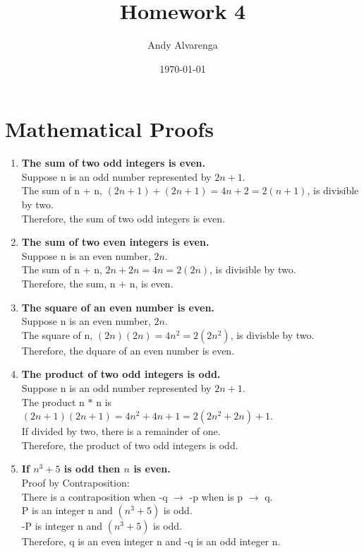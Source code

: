 \documentclass[11pt]{article}
\begin{document}
\title{Homework 4}
\author{Andy Alvarenga}
\date{\today}
\maketitle

\section{Mathematical Proofs}

\begin{enumerate}

\item
\textbf{The sum of two odd integers is even.}\\
Suppose n is an odd number represented by $2n + 1$.\\
The sum of n + n,  $(2n+1)+(2n+1)=4n+2=2(n+1)$, is divisible by two.\\
Therefore, the sum of two odd integers is even.\\

\item
\textbf{The sum of two even integers is even.}\\
Suppose n is an even number, $2n$.\\
The sum of n + n,  $2n+2n=4n=2(2n)$, is divisible by two.\\
Therefore, the sum, n + n, is even.\\

\item
\textbf{The square of an even number is even.}\\
Suppose n is an even number, $2n$.\\
The square of n, $(2n)(2n)=4n^2=2(2n^2)$, is divisble by two.\\
Therefore, the dquare of an even number is even.\\

\item
\textbf{The product of two odd integers is odd.}\\
Suppose n is an odd number represented by $2n + 1$.\\
The product n $*$ n is  $(2n+1)(2n+1)=4n^2+4n+1=2(2n^2+2n)+1$.\\
If divided by two, there is a remainder of one. \\
Therefore, the product of two odd integers is odd.\\

\item
\textbf{If  $n^3+5$ is odd then $n$ is even.}\\
Proof by Contraposition:\\
There is a contraposition when -q $\rightarrow$ -p when is p $\rightarrow$ q.\\
P is an integer n and $(n^3+5)$ is odd.\\
-P is integer n and  $(n^3+5)$ is odd.\\
Therefore, q is an even integer n and -q is an odd integer n.\\


\end{enumerate}
\end{document}

